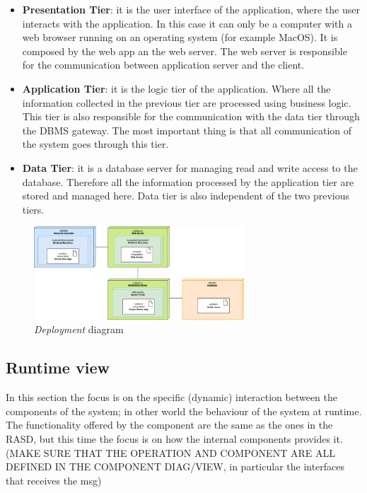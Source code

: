 \begin{itemize}
    \item \textbf{Presentation Tier}: it is the user interface of the application, where the user interacts with the application. 
    In this case it can only be a computer with a web browser running on an operating system (for example MacOS).
    It is composed by the web app an the web server. The web server is responsible for the communication between application server 
    and the client.

    \item \textbf{Application Tier}: it is the logic tier of the application. Where all the information 
    collected in the previous tier are processed using business logic. This tier is also 
    responsible for the communication with the data tier through the DBMS gateway.
    The most important thing is that all communication of the system goes through this tier.

    \item \textbf{Data Tier}: it is a database server for managing read and write access to the database. 
    Therefore all the information processed by the application tier are stored and managed here.
    Data tier is also independent of the two previous tiers. 
\end{itemize}

\begin{figure}[H]
    \begin{center}
    \includegraphics[width=0.7\textwidth]{images/Deployment diagram.png}
    \caption{\emph{Deployment} diagram}
    \label{fig:deployment}
    \end{center}
\end{figure}
\subsection{Runtime view}

In this section the focus is on the specific (dynamic) interaction between the components of the system; in other world the behaviour of the system at runtime.
The functionality offered by the component are the same as the ones in the RASD, but this time the focus is on how the internal components provides it.
(MAKE SURE THAT THE OPERATION AND COMPONENT ARE ALL DEFINED IN THE COMPONENT DIAG/VIEW, in particular the interfaces that receives the msg)

